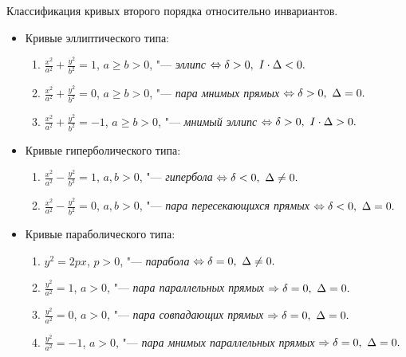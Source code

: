     \begin{proposition}{Классификация кривых второго порядка относительно инвариантов.} \\
        \begin{itemize}
    		\item Кривые эллиптического типа:
    		\begin{enumerate}
    			\item $\frac{x^2}{a^2} + \frac{y^2}{b^2} = 1$, $a \ge b > 0$, "--- \textit{эллипс} $\lra \delta > 0, \ I\cdot\Delta < 0.$
    			\item $\frac{x^2}{a^2} + \frac{y^2}{b^2} = 0$, $a \ge b > 0$, "--- \textit{пара мнимых прямых} $\Leftrightarrow \delta > 0, \ \Delta = 0.$
    			\item $\frac{x^2}{a^2} + \frac{y^2}{b^2} = -1$, $a \ge b > 0$, "--- \textit{мнимый эллипс} $\Leftrightarrow \delta > 0, \ I\cdot\Delta > 0.$
    		\end{enumerate}
    	
    		\item Кривые гиперболического типа:
    		\begin{enumerate}
    			\item $\frac{x^2}{a^2} - \frac{y^2}{b^2} = 1$, $a, b > 0$, "--- \textit{гипербола} $\lra \delta < 0, \ \Delta \neq 0.$
    			\item $\frac{x^2}{a^2} - \frac{y^2}{b^2} = 0$, $a, b > 0$, "--- \textit{пара пересекающихся прямых} $\Leftrightarrow \delta < 0, \ \Delta = 0.$
    		\end{enumerate}
    	
    		\item Кривые параболического типа:
    		\begin{enumerate}
    			\item $y^2 = 2px$, $p > 0$, "--- \textit{парабола} $\lra \delta = 0, \ \Delta \neq 0.$
    			\item $\frac{y^2}{a^2} = 1$, $a > 0$, "--- \textit{пара параллельных прямых} $\Rightarrow \delta = 0, \ \Delta = 0.$
    			\item $\frac{y^2}{a^2} = 0$, $a > 0$, "--- \textit{пара совпадающих прямых} $\Rightarrow \delta = 0, \ \Delta = 0.$
    			\item $\frac{y^2}{a^2} = -1$, $a > 0$, "--- \textit{пара мнимых параллельных прямых} $\Rightarrow \delta = 0, \ \Delta = 0.$
    		\end{enumerate}
    	\end{itemize}
    \end{proposition}
